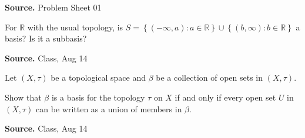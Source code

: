 \documentclass[12pt,twoside]{report}
\newenvironment*{source}{\hfill\scriptsize\textbf{Source.}\space}{\par}
\begin{document}
\begin{samepage}
\begin{ex}
\end{ex}
\begin{source}
Problem Sheet 01
\end{source}
\end{samepage}

\begin{samepage}
\begin{ex}
    For $\mathbb{R}$ with the usual topology, is $S = \left\{ \left (- \infty, a\right )  :  a \in \mathbb{R} \right\} \cup \left\{ \left (b, \infty\right )  :  b \in \mathbb{R} \right\}$ a basis? Is it a subbasis?
\end{ex}
\begin{source}
Class, Aug 14
\end{source}
\end{samepage}

\begin{samepage}
\begin{ex}
Let $\left (X, \tau\right )$ be a topological space and $\beta$ be a collection of open sets in $\left (X, \tau\right )$. 

Show that $\beta$ is a basis for the topology $\tau$ on $X$ if and only if every open set $U$ in $\left (X, \tau\right )$ can be written as a union of members in $\beta$.
\end{ex}
\begin{source}
Class, Aug 14
\end{source}
\end{samepage}
\end{document}
